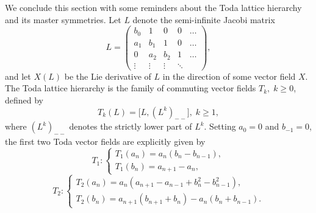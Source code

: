 \documentclass[10pt, reqno]{amsart}
\numberwithin{equation}{section}
\numberwithin{equation}{section}
\begin{document}
We conclude this section with some reminders about the Toda lattice hierarchy and its master symmetries. Let $L$ denote the semi-infinite Jacobi matrix
\begin{equation}
L=\begin{pmatrix}b_0&1&0&0&\ldots\\
a_1&b_1&1&0&\ldots\\
0&a_2&b_2&1&\ldots\\
\vdots&\vdots&\vdots&\ddots
\end{pmatrix},\label{todajac}
\end{equation}
and let $X(L)$ be the Lie derivative of $L$ in the direction of some vector field $X$. The Toda lattice hierarchy is the family of commuting vector fields $T_k,\;k \geq 0$, defined by
\begin{equation*}
T_k(L)= \big[L,(L^k)_{--}\big],\; k\geq 1,
\end{equation*}
where $(L^k)_{--}$ denotes the strictly lower part of $L^k$. Setting $a_0=0$ and $b_{-1}=0$, the first two Toda vector fields are explicitly given by
\begin{equation}
T_1: \begin{cases} T_1(a_n)=a_n(b_n-b_{n-1}),\\T_1(b_n)=a_{n+1}-a_n,\end{cases}\label{T1}
\end{equation}
\begin{equation}
T_2:\begin{cases} T_2(a_n)=a_n(a_{n+1}-a_{n-1}+b_n^2-b_{n-1}^2),\\T_2(b_n)=a_{n+1}(b_{n+1}+b_n)-a_n(b_n+b_{n-1}).\end{cases}\label{T2}
\end{equation}
\end{document}
